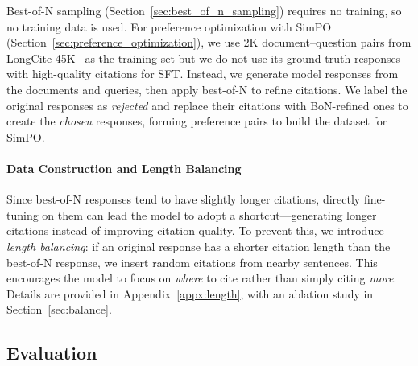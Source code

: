 Best-of-N sampling (Section~\ref{sec:best_of_n_sampling}) requires no training, so no training data is used. For preference optimization with SimPO (Section~\ref{sec:preference_optimization}), we use 2K document–question pairs from LongCite-45K~\citep{zhang2024longcite} as the training set but we do not use its ground-truth responses with high-quality citations for SFT. Instead, we generate model responses from the documents and queries, then apply best-of-N to refine citations. We label the original responses as \emph{rejected} and replace their citations with BoN-refined ones to create the \emph{chosen} responses, forming preference pairs to build the dataset for SimPO.

\paragraph{Data Construction and Length Balancing}

Since best-of-N responses tend to have slightly longer citations, directly fine-tuning on them can lead the model to adopt a shortcut—generating longer citations instead of improving citation quality. To prevent this, we introduce \emph{length balancing}: if an original response has a shorter citation length than the best-of-N response, we insert random citations from nearby sentences. This encourages the model to focus on \emph{where} to cite rather than simply citing \emph{more}. Details are provided in Appendix~\ref{appx:length}, with an ablation study in Section~\ref{sec:balance}.


\subsection{Evaluation}
\label{subsec:datasets}

